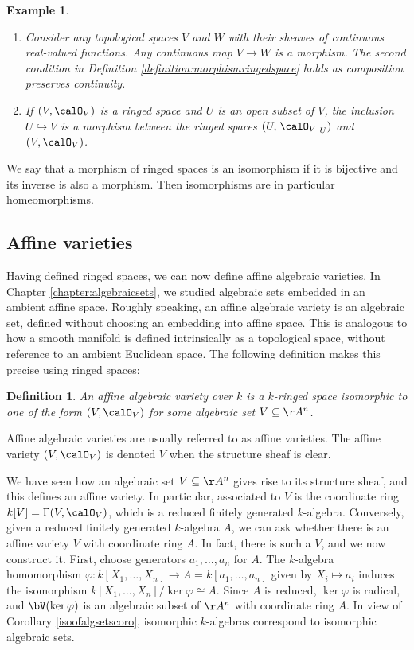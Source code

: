 \documentclass[12pt]{amsart}
\theoremstyle{plain}
\newtheorem{definition}[theorem]{Definition}
\newtheorem{example}[theorem]{Example}
\begin{document}
\begin{example}
\begin{enumerate}
\item
Consider any topological spaces $V$ and $W$ with their sheaves of continuous real-valued functions.
Any continuous map $V \to W$ is a morphism. The second condition in Definition \ref{definition:morphismringedspace} holds as composition preserves continuity.

\item
If $(V, \calO_V)$ is a ringed space and $U$ is an open subset of $V$, the inclusion $U \hookrightarrow V$ is a morphism between the ringed spaces $(U, \left. \calO_V\right|_U)$ and $(V, \calO_V)$.
\end{enumerate}
\end{example}

We say that a morphism of ringed spaces is an isomorphism if it is bijective and its inverse is also a morphism.
Then isomorphisms are in particular homeomorphisms.

\subsection{Affine varieties}
Having defined ringed spaces, we can now define affine algebraic varieties.
In Chapter \ref{chapter:algebraicsets}, we studied algebraic sets embedded in an ambient affine space.
Roughly speaking, an affine algebraic variety is an algebraic set, defined without choosing an embedding into affine space.
This is analogous to how a smooth manifold is defined intrinsically as a topological space, without reference to an ambient Euclidean space.
The following definition makes this precise using ringed spaces:

\begin{definition}
An affine algebraic variety over $k$ is a $k$-ringed space isomorphic to one of the form $(V, \calO_V)$ for some algebraic set $V \subseteq \AA^n$.
\end{definition}

Affine algebraic varieties are usually referred to as affine varieties.
The affine variety $(V, \calO_V)$ is denoted $V$ when the structure sheaf is clear.

We have seen how an algebraic set $V \subseteq \AA^n$ gives rise to its structure sheaf, and this defines an affine variety.
In particular, associated to $V$ is the coordinate ring $k[V] = \Gamma(V, \calO_V)$, which is a reduced finitely generated $k$-algebra.
Conversely, given a reduced finitely generated $k$-algebra $A$, we can ask whether there is an affine variety $V$ with coordinate ring $A$.
In fact, there is such a $V$, and we now construct it.
First, choose generators $a_1, \ldots, a_n$ for $A$.
The $k$-algebra homomorphism $\varphi : k[X_1, \ldots, X_n] \to A=k[a_1,\ldots,a_n]$ given by $X_i \mapsto a_i$ induces the isomorphism $k[X_1, \ldots, X_n] / \ker \varphi \cong A$.
Since $A$ is reduced, $\ker\varphi$ is radical, and $\bV(\ker \varphi)$ is an algebraic subset of $\AA^n$ with coordinate ring $A$.
In view of Corollary \ref{isoofalgsetscoro}, isomorphic $k$-algebras correspond to isomorphic algebraic sets.
\end{document}
